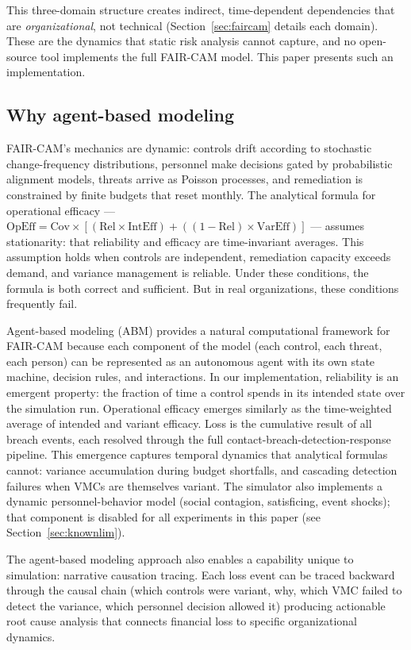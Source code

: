 \documentclass[11pt,a4paper]{article}
\begin{document}
This three-domain structure creates indirect, time-dependent dependencies that are \emph{organizational}, not technical (Section~\ref{sec:faircam} details each domain). These are the dynamics that static risk analysis cannot capture, and no open-source tool implements the full FAIR-CAM model. This paper presents such an implementation.

\subsection{Why agent-based modeling}

FAIR-CAM's mechanics are dynamic: controls drift according to stochastic change-frequency distributions, personnel make decisions gated by probabilistic alignment models, threats arrive as Poisson processes, and remediation is constrained by finite budgets that reset monthly. The analytical formula for operational efficacy --- $\mathrm{OpEff} = \mathrm{Cov} \times [(\mathrm{Rel} \times \mathrm{IntEff}) + ((1-\mathrm{Rel}) \times \mathrm{VarEff})]$ --- assumes stationarity: that reliability and efficacy are time-invariant averages. This assumption holds when controls are independent, remediation capacity exceeds demand, and variance management is reliable. Under these conditions, the formula is both correct and sufficient. But in real organizations, these conditions frequently fail.

Agent-based modeling (ABM) provides a natural computational framework for FAIR-CAM because each component of the model (each control, each threat, each person) can be represented as an autonomous agent with its own state machine, decision rules, and interactions. In our implementation, reliability is an emergent property: the fraction of time a control spends in its intended state over the simulation run. Operational efficacy emerges similarly as the time-weighted average of intended and variant efficacy. Loss is the cumulative result of all breach events, each resolved through the full contact-breach-detection-response pipeline. This emergence captures temporal dynamics that analytical formulas cannot: variance accumulation during budget shortfalls, and cascading detection failures when VMCs are themselves variant. The simulator also implements a dynamic personnel-behavior model (social contagion, satisficing, event shocks); that component is disabled for all experiments in this paper (see Section~\ref{sec:knownlim}).

The agent-based modeling approach also enables a capability unique to simulation: narrative causation tracing. Each loss event can be traced backward through the causal chain (which controls were variant, why, which VMC failed to detect the variance, which personnel decision allowed it) producing actionable root cause analysis that connects financial loss to specific organizational dynamics.
\end{document}
